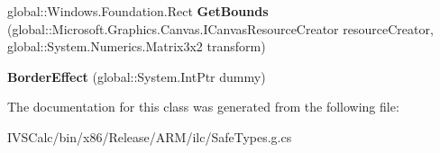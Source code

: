 \begin{DoxyCompactItemize}
\mbox{\label{class_microsoft_1_1_graphics_1_1_canvas_1_1_effects_1_1_border_effect_a71d105763b501f2e7bcdb69338ce699c}} 
global\+::\+Windows.\+Foundation.\+Rect {\bfseries Get\+Bounds} (global\+::\+Microsoft.\+Graphics.\+Canvas.\+I\+Canvas\+Resource\+Creator resource\+Creator, global\+::\+System.\+Numerics.\+Matrix3x2 transform)
\item 
\mbox{\label{class_microsoft_1_1_graphics_1_1_canvas_1_1_effects_1_1_border_effect_a2047b145d942967ddaf531f628fd6457}} 
{\bfseries Border\+Effect} (global\+::\+System.\+Int\+Ptr dummy)
\end{DoxyCompactItemize}


The documentation for this class was generated from the following file\+:\begin{DoxyCompactItemize}
\item 
I\+V\+S\+Calc/bin/x86/\+Release/\+A\+R\+M/ilc/Safe\+Types.\+g.\+cs\end{DoxyCompactItemize}
